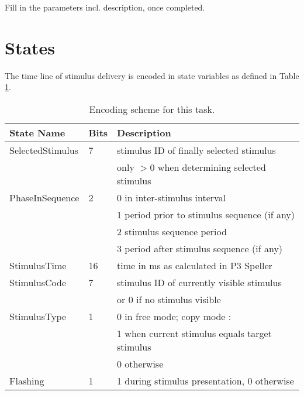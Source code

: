 \documentclass[letterpaper,oneside,12pt]{article}
\begin{document}
Fill in the parameters incl. description, once completed.


\section{States}

The time line of stimulus delivery is encoded in state variables as defined in
Table \ref{tab:states}.
\begin{table}
\begin{center}
\begin{tabular}[ht]{|l|l|l|}
\hline
\bf{State Name}& \bf{Bits}            & \bf{Description} \\
\hline
\hline
 SelectedStimulus & 7 & stimulus ID of finally selected stimulus \\
                  &   & only $>$0 when determining selected stimulus\\
\hline
 PhaseInSequence  & 2 & 0 in inter-stimulus interval\\
                  &   & 1 period prior to stimulus sequence (if any)\\
                  &   & 2 stimulus sequence period\\
                  &   & 3 period after stimulus sequence (if any)\\
\hline
 StimulusTime     & 16& time in ms as calculated in P3 Speller\\
\hline
 StimulusCode     & 7 & stimulus ID of currently visible stimulus\\
                  &   & or 0 if no stimulus visible\\
\hline
 StimulusType     & 1 & 0 in free mode; copy mode :\\
                  &   & 1 when current stimulus equals target stimulus\\
                  &   & 0 otherwise\\
\hline
 Flashing         & 1 & 1 during stimulus presentation, 0 otherwise\\
\hline
\end{tabular}
\caption{Encoding scheme for this task.}
\label{tab:states}
\end{center}
\end{table}

\end{document}
